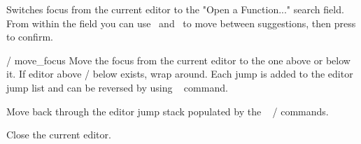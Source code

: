 Switches focus from the current editor to the "Open a Function..." search
field. From within the field you can use~\ak{^} and~ to move between
suggestions, then press \keys{\return} to confirm.

	{ / }{move_focus}
Move the focus from the current editor to the one above or below it. If
editor above / below exists, wrap around. Each jump is added to the
editor jump list and can be reversed by using
\hyperref[cmd:jump_back]{}~ command.

Move back through the editor jump stack populated by the
\hyperref[cmd:move_focus]{}~
 /  commands.

Close the current editor.
